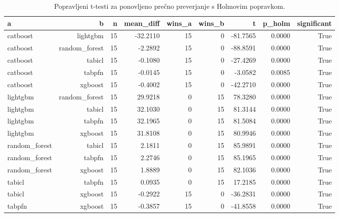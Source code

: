 \begin{table}[htbp]
\centering
\caption{Popravljeni t-testi za ponovljeno prečno preverjanje s Holmovim popravkom.}
\label{tab:corrected-ttest}
\begin{tabular}{lrrrrrrrr}
\hline
a & b & n & mean\_diff & wins\_a & wins\_b & t & p\_holm & significant \\
\hline
catboost & lightgbm & 15 & -32.2110 & 15 & 0 & -81.7565 & 0.0000 & True \\
catboost & random\_forest & 15 & -2.2892 & 15 & 0 & -88.8591 & 0.0000 & True \\
catboost & tabicl & 15 & -0.1080 & 15 & 0 & -27.4269 & 0.0000 & True \\
catboost & tabpfn & 15 & -0.0145 & 15 & 0 & -3.0582 & 0.0085 & True \\
catboost & xgboost & 15 & -0.4002 & 15 & 0 & -42.2710 & 0.0000 & True \\
lightgbm & random\_forest & 15 & 29.9218 & 0 & 15 & 78.3280 & 0.0000 & True \\
lightgbm & tabicl & 15 & 32.1030 & 0 & 15 & 81.3144 & 0.0000 & True \\
lightgbm & tabpfn & 15 & 32.1965 & 0 & 15 & 81.5084 & 0.0000 & True \\
lightgbm & xgboost & 15 & 31.8108 & 0 & 15 & 80.9946 & 0.0000 & True \\
random\_forest & tabicl & 15 & 2.1811 & 0 & 15 & 85.9891 & 0.0000 & True \\
random\_forest & tabpfn & 15 & 2.2746 & 0 & 15 & 85.1965 & 0.0000 & True \\
random\_forest & xgboost & 15 & 1.8889 & 0 & 15 & 82.1036 & 0.0000 & True \\
tabicl & tabpfn & 15 & 0.0935 & 0 & 15 & 17.2185 & 0.0000 & True \\
tabicl & xgboost & 15 & -0.2922 & 15 & 0 & -36.2831 & 0.0000 & True \\
tabpfn & xgboost & 15 & -0.3857 & 15 & 0 & -41.8558 & 0.0000 & True \\
\hline
\end{tabular}
\end{table}

